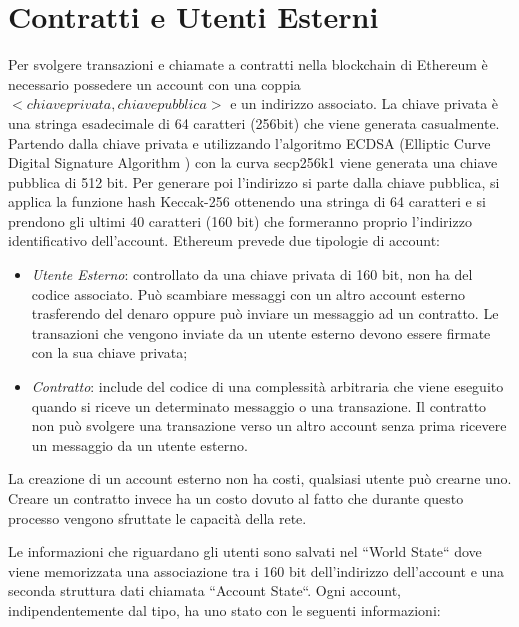 \documentclass[12pt]{report}
\begin{document}
\section{Contratti e Utenti Esterni}
Per svolgere transazioni e chiamate a contratti nella blockchain di Ethereum è necessario possedere un account con una coppia $<chiave privata, chiave pubblica>$ e un indirizzo associato.
La chiave privata è una stringa esadecimale di 64 caratteri (256bit) che viene generata casualmente. Partendo dalla chiave privata e utilizzando l'algoritmo ECDSA (Elliptic Curve Digital Signature Algorithm ) con la curva secp256k1 viene generata una chiave pubblica di 512 bit.
Per generare poi l'indirizzo si parte dalla chiave pubblica, si applica la funzione hash Keccak-256 ottenendo una stringa di 64 caratteri e si prendono gli ultimi 40 caratteri (160 bit) che formeranno proprio l'indirizzo identificativo dell'account.
Ethereum prevede due tipologie di account:

\begin{itemize}
\item \textit{Utente Esterno}: controllato da una chiave privata di 160 bit, non ha del codice associato. Può scambiare messaggi con un altro account esterno trasferendo del denaro oppure può inviare un messaggio ad un contratto. Le transazioni che vengono inviate da un utente esterno devono essere firmate con la sua chiave privata;
\item \textit{Contratto}: include del codice di una complessità arbitraria che viene eseguito quando si riceve un determinato messaggio o una transazione.
Il contratto non può svolgere una transazione verso un altro account senza prima ricevere un messaggio da un utente esterno.
\end{itemize}

La creazione di un account esterno non ha costi, qualsiasi utente può crearne uno.
Creare un contratto invece ha un costo dovuto al fatto che durante questo processo vengono sfruttate le capacità della rete.

Le informazioni che riguardano gli utenti sono salvati nel ``World State`` dove viene memorizzata una associazione tra i 160 bit dell'indirizzo dell'account e una seconda struttura dati chiamata ``Account State``.
Ogni account, indipendentemente dal tipo, ha uno stato con le seguenti informazioni:
\end{document}
